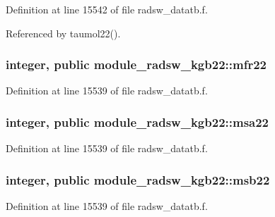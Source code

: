 Definition at line 15542 of file radsw\+\_\+datatb.\+f.



Referenced by taumol22().

\subsubsection[{\texorpdfstring{mfr22}{mfr22}}]{\setlength{\rightskip}{0pt plus 5cm}integer, public module\+\_\+radsw\+\_\+kgb22\+::mfr22}\hypertarget{namespacemodule__radsw__kgb22_a0afe8facbe4837a22c96a0d2000a20ee}{}\label{namespacemodule__radsw__kgb22_a0afe8facbe4837a22c96a0d2000a20ee}


Definition at line 15539 of file radsw\+\_\+datatb.\+f.

\subsubsection[{\texorpdfstring{msa22}{msa22}}]{\setlength{\rightskip}{0pt plus 5cm}integer, public module\+\_\+radsw\+\_\+kgb22\+::msa22}\hypertarget{namespacemodule__radsw__kgb22_a4134c2cd3b31db5e0adb5c3c2ad87905}{}\label{namespacemodule__radsw__kgb22_a4134c2cd3b31db5e0adb5c3c2ad87905}


Definition at line 15539 of file radsw\+\_\+datatb.\+f.

\subsubsection[{\texorpdfstring{msb22}{msb22}}]{\setlength{\rightskip}{0pt plus 5cm}integer, public module\+\_\+radsw\+\_\+kgb22\+::msb22}\hypertarget{namespacemodule__radsw__kgb22_a3398f8d12ec0349b44197873ac58fd98}{}\label{namespacemodule__radsw__kgb22_a3398f8d12ec0349b44197873ac58fd98}


Definition at line 15539 of file radsw\+\_\+datatb.\+f.

